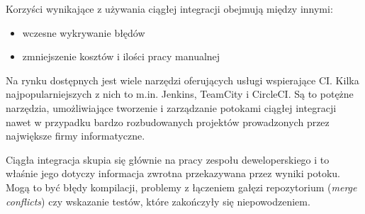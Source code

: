 \documentclass[twoside,a4paper]{report}
\begin{document}
Korzyści wynikające z używania ciągłej integracji obejmują między innymi:
\begin{itemize}[noitemsep,topsep=0pt]
    \item wczesne wykrywanie błędów
    \item zmniejszenie kosztów i ilości pracy manualnej
\end{itemize}

Na rynku dostępnych jest wiele narzędzi oferujących usługi wspierające CI\@.
Kilka najpopularniejszych z nich to m.in. Jenkins, TeamCity i CircleCI\@.
Są to potężne narzędzia, umożliwiające tworzenie i zarządzanie potokami ciągłej integracji nawet w przypadku bardzo rozbudowanych projektów prowadzonych przez największe firmy informatyczne.

Ciągła integracja skupia się głównie na pracy zespołu deweloperskiego i to właśnie jego dotyczy informacja zwrotna przekazywana przez wyniki potoku.
Mogą to być błędy kompilacji, problemy z łączeniem gałęzi repozytorium (\textit{merge conflicts}) czy wskazanie testów, które zakończyły się niepowodzeniem.
\end{document}
